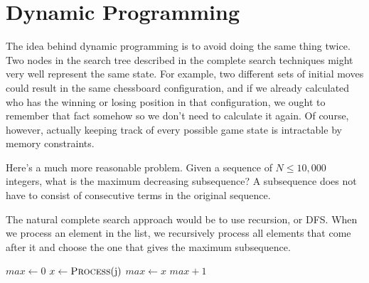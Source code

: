 \documentclass[11pt]{book}
\begin{document}
\section{Dynamic Programming}

The idea behind dynamic programming is to avoid doing the same thing twice. Two nodes in the search tree described in the complete search techniques might very well represent the same state. For example, two different sets of initial moves could result in the same chessboard configuration, and if we already calculated who has the winning or losing position in that configuration, we ought to remember that fact somehow so we don't need to calculate it again. Of course, however, actually keeping track of every possible game state is intractable by memory constraints.

Here's a much more reasonable problem. Given a sequence of $N \le 10,000$ integers, what is the maximum decreasing subsequence? A subsequence does not have to consist of consecutive terms in the original sequence.

\begin{center}
{
}
\end{center}

The natural complete search approach would be to use recursion, or DFS. When we process an element in the list, we recursively process all elements that come after it and choose the one that gives the maximum subsequence.

\begin{algorithmic}
\State $max \gets 0$
		\State $x \gets \Call{Process}{$j$}$
			\State $max \gets x$
		\EndIf
	\EndIf
\EndFor
\State \Return $max + 1$
\EndFunction
\end{algorithmic}
\end{document}
